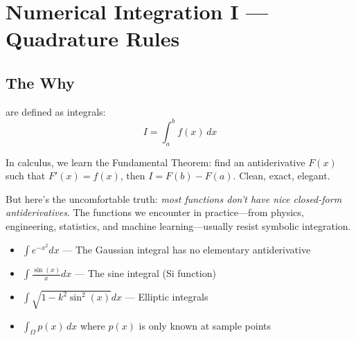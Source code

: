 \chapter{Numerical Integration I --- Quadrature Rules}



\section{The Why}

 are defined as integrals:
\begin{equation}
    I = \int_a^b f(x) \, dx
\end{equation}

In calculus, we learn the Fundamental Theorem: find an antiderivative $F(x)$ such that $F'(x) = f(x)$, then $I = F(b) - F(a)$. Clean, exact, elegant.

But here's the uncomfortable truth: \emph{most functions don't have nice closed-form antiderivatives}. The functions we encounter in practice---from physics, engineering, statistics, and machine learning---usually resist symbolic integration.

\begin{itemize}
    \item $\int e^{-x^2} dx$ --- The Gaussian integral has no elementary antiderivative
    \item $\int \frac{\sin(x)}{x} dx$ --- The sine integral (Si function)
    \item $\int \sqrt{1 - k^2\sin^2(x)} dx$ --- Elliptic integrals
    \item $\int_\Omega p(x) \, dx$ where $p(x)$ is only known at sample points
\end{itemize}


